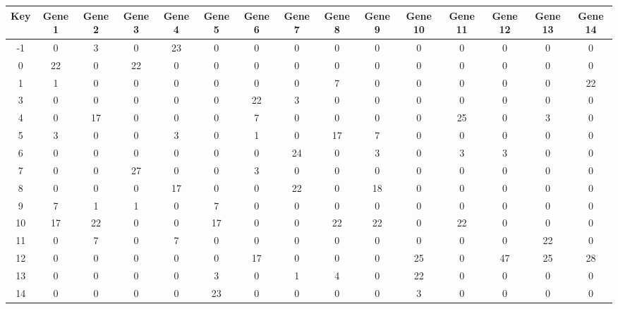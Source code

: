 \begin{tabular}{|c|c|c|c|c|c|c|c|c|c|c|c|c|c|c|}
\hline
Key & Gene 1 & Gene 2 & Gene 3 & Gene 4 & Gene 5 & Gene 6 & Gene 7 & Gene 8 & Gene 9 & Gene 10 & Gene 11 & Gene 12 & Gene 13 & Gene 14 \\
\hline
-1 & 0 & 3 & 0 & 23 & 0 & 0 & 0 & 0 & 0 & 0 & 0 & 0 & 0 & 0 \\
0 & 22 & 0 & 22 & 0 & 0 & 0 & 0 & 0 & 0 & 0 & 0 & 0 & 0 & 0 \\
1 & 1 & 0 & 0 & 0 & 0 & 0 & 0 & 7 & 0 & 0 & 0 & 0 & 0 & 22 \\
3 & 0 & 0 & 0 & 0 & 0 & 22 & 3 & 0 & 0 & 0 & 0 & 0 & 0 & 0 \\
4 & 0 & 17 & 0 & 0 & 0 & 7 & 0 & 0 & 0 & 0 & 25 & 0 & 3 & 0 \\
5 & 3 & 0 & 0 & 3 & 0 & 1 & 0 & 17 & 7 & 0 & 0 & 0 & 0 & 0 \\
6 & 0 & 0 & 0 & 0 & 0 & 0 & 24 & 0 & 3 & 0 & 3 & 3 & 0 & 0 \\
7 & 0 & 0 & 27 & 0 & 0 & 3 & 0 & 0 & 0 & 0 & 0 & 0 & 0 & 0 \\
8 & 0 & 0 & 0 & 17 & 0 & 0 & 22 & 0 & 18 & 0 & 0 & 0 & 0 & 0 \\
9 & 7 & 1 & 1 & 0 & 7 & 0 & 0 & 0 & 0 & 0 & 0 & 0 & 0 & 0 \\
10 & 17 & 22 & 0 & 0 & 17 & 0 & 0 & 22 & 22 & 0 & 22 & 0 & 0 & 0 \\
11 & 0 & 7 & 0 & 7 & 0 & 0 & 0 & 0 & 0 & 0 & 0 & 0 & 22 & 0 \\
12 & 0 & 0 & 0 & 0 & 0 & 17 & 0 & 0 & 0 & 25 & 0 & 47 & 25 & 28 \\
13 & 0 & 0 & 0 & 0 & 3 & 0 & 1 & 4 & 0 & 22 & 0 & 0 & 0 & 0 \\
14 & 0 & 0 & 0 & 0 & 23 & 0 & 0 & 0 & 0 & 3 & 0 & 0 & 0 & 0 \\
\hline
\end{tabular}